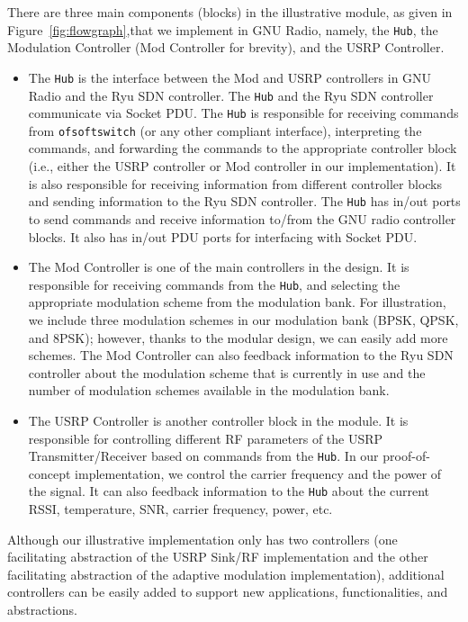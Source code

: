 There are three main components (blocks) in the illustrative \crossflow module, as given in Figure~\ref{fig:flowgraph},that we implement in GNU Radio, namely, the \texttt{\crossflow Hub}, the Modulation Controller (Mod Controller for brevity), and the USRP Controller.
\begin{itemize}
\item The \texttt{\crossflow Hub} is the interface between the Mod and USRP controllers in GNU Radio and the Ryu SDN controller. The \texttt{\crossflow Hub} and the Ryu SDN controller communicate via Socket PDU. The \texttt{\crossflow Hub} is responsible for receiving commands from \texttt{ofsoftswitch} (or any other compliant interface), interpreting the commands, and forwarding the commands to the appropriate controller block (i.e., either the USRP controller or Mod controller in our implementation). It is also responsible for receiving information from different controller blocks and sending information to the Ryu SDN controller. The \texttt{\crossflow Hub} has in/out ports to send commands and receive information to/from the GNU radio controller blocks. It also has in/out PDU ports for interfacing with Socket PDU.
\item The Mod Controller is one of the main controllers in the design. It is responsible for receiving commands from the \texttt{\crossflow Hub}, and selecting the appropriate modulation scheme from the modulation bank. For illustration, we include three modulation schemes in our modulation bank (BPSK, QPSK, and 8PSK); however, thanks to the modular design, we can easily add more schemes. The Mod Controller can also feedback information to the Ryu SDN controller about the modulation scheme that is currently in use and the number of modulation schemes available in the modulation bank.
\item The USRP Controller is another controller block in the \crossflow module. It is responsible for controlling different RF parameters of the USRP Transmitter/Receiver based on commands from the \texttt{\crossflow Hub}. In our proof-of-concept implementation, we control the carrier frequency and the power of the signal. It can also feedback information to the \texttt{\crossflow Hub} about the current RSSI, temperature, SNR, carrier frequency, power, etc.
\end{itemize}
Although our illustrative implementation only has two controllers (one facilitating abstraction of the USRP Sink/RF implementation and the other facilitating abstraction of the adaptive modulation implementation), additional controllers can be easily added to support new applications, functionalities, and abstractions.

